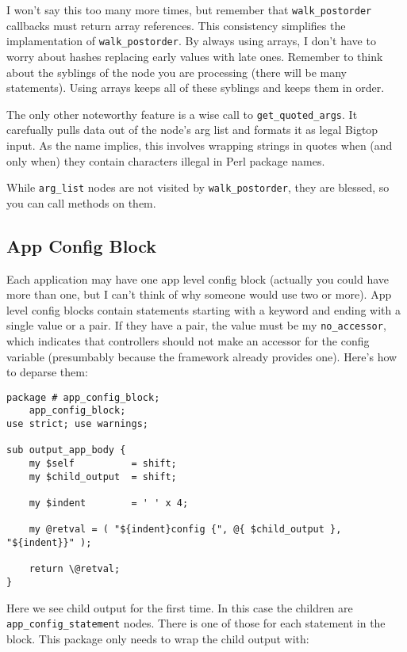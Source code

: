 I won't say this too many more times, but remember that \verb+walk_postorder+
callbacks must return array references.  This consistency simplifies the
implamentation of \verb+walk_postorder+.  By always using arrays, I don't have
to worry about hashes replacing early values with late ones.  Remember
to think about the syblings of the node you are processing (there will be
many statements).  Using arrays keeps all of these syblings and keeps them
in order.

The only other noteworthy feature is a wise call to \verb+get_quoted_args+.
It carefually pulls data out of the node's arg list and formats it as
legal Bigtop input.  As the name implies, this involves wrapping strings in
quotes when (and only when) they contain characters illegal in Perl
package names.

While \verb+arg_list+ nodes are not visited by \verb+walk_postorder+, they
are blessed, so you can call methods on them.

\subsection*{App Config Block}

Each application may have one app level config block (actually you could have
more than one, but I can't think of why someone would use two or more).
App level config blocks contain statements starting with a keyword and
ending with a single value or a pair.  If they have a pair, the value
must be my \verb+no_accessor+, which indicates that controllers should
not make an accessor for the config variable (presumbably because the
framework already provides one).  Here's how to deparse them:

\begin{verbatim}
package # app_config_block;
    app_config_block;
use strict; use warnings;

sub output_app_body {
    my $self          = shift;
    my $child_output  = shift;

    my $indent        = ' ' x 4;

    my @retval = ( "${indent}config {", @{ $child_output }, "${indent}}" );

    return \@retval;
}
\end{verbatim}

Here we see child output for the first time.  In this case the children
are \verb+app_config_statement+ nodes.  There is one of those for
each statement in the block.  This package only needs to wrap the child
output with:

